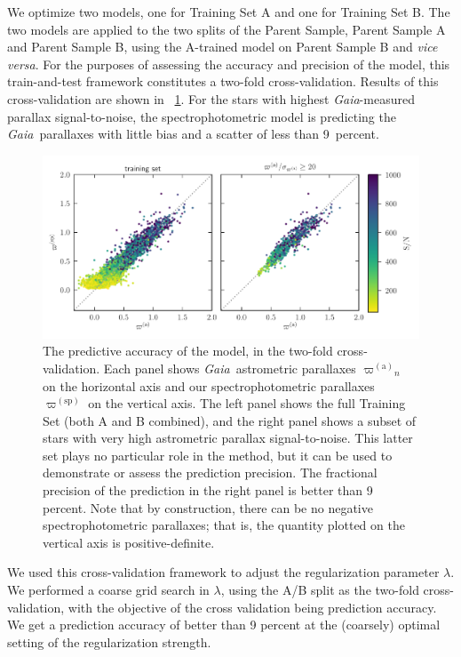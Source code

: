 \documentclass[modern]{aastex62}
\newcommand{\foreign}[1]{\textsl{#1}}
\newcommand{\project}[1]{\textsl{#1}}
\newcommand{\gaia}{\project{Gaia}}
\newcommand{\gparallax}{{\varpi^{(\mathrm{a})}}}
\newcommand{\sparallax}{{\varpi^{(\mathrm{sp})}}}
\begin{document}
We optimize two models, one for Training Set A and one for Training Set B.
The two models are applied to the two splits of the Parent Sample, Parent Sample
A and Parent Sample B, using the A-trained model on Parent Sample B and
\foreign{vice versa}.
For the purposes of assessing the accuracy and precision of the model, this
train-and-test framework constitutes a two-fold cross-validation.
Results of this cross-validation are shown in \figurename~\ref{fig:xval}.
For the stars with highest \gaia-measured parallax signal-to-noise,
the spectrophotometric model is predicting the \gaia\ parallaxes with little bias
and a scatter of less than 9~percent.
\begin{figure}
\includegraphics[width=\textwidth]{residuals.pdf}
\caption{The predictive accuracy of the model, in the two-fold cross-validation.
  Each panel shows \gaia\ astrometric parallaxes $\gparallax_n$ on the horizontal axis
  and our spectrophotometric parallaxes $\sparallax$ on the vertical axis.
  The left panel shows the full Training Set (both A and B combined),
  and the right panel shows a
  subset of stars with very high astrometric parallax signal-to-noise. This latter
  set plays no particular role in the method, but it can be used to demonstrate or
  assess the prediction precision. The fractional precision of the prediction in the
  right panel is better than 9 percent. Note that by construction, there can be no negative
  spectrophotometric parallaxes; that is, the quantity plotted on the vertical axis is
  positive-definite.\label{fig:xval}}
\end{figure}

We used this cross-validation framework to adjust the regularization parameter $\lambda$.
We performed a coarse grid search in $\lambda$,
using the A/B split as the two-fold cross-validation, with the objective
of the cross validation being prediction accuracy.
We get a prediction accuracy of better than 9 percent 
at the (coarsely) optimal setting of the regularization strength.
\end{document}

